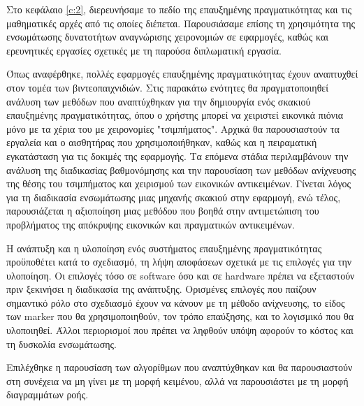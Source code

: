 

 \label{c:design}



Στο κεφάλαιο \ref{c:2}, διερευνήσαμε το πεδίο της επαυξημένης πραγματικότητας και τις μαθηματικές αρχές από τις οποίες διέπεται. Παρουσιάσαμε επίσης τη χρησιμότητα της ενσωμάτωσης δυνατοτήτων αναγνώρισης χειρονομιών σε εφαρμογές, καθώς και ερευνητικές εργασίες σχετικές με τη παρούσα διπλωματική εργασία.


Όπως αναφέρθηκε, πολλές εφαρμογές επαυξημένης πραγματικότητας έχουν αναπτυχθεί στον τομέα των βιντεοπαιχνιδιών. Στις παρακάτω ενότητες θα πραγματοποιηθεί ανάλυση των μεθόδων που αναπτύχθηκαν για την δημιουργία ενός σκακιού επαυξημένης πραγματικότητας, όπου ο χρήστης μπορεί να χειριστεί εικονικά πιόνια μόνο με τα χέρια του με χειρονομίες "τσιμπήματος". Αρχικά θα παρουσιαστούν τα εργαλεία και ο αισθητήρας που χρησιμοποιήθηκαν, καθώς και η πειραματική εγκατάσταση για τις δοκιμές της εφαρμογής. Τα επόμενα στάδια περιλαμβάνουν την ανάλυση της διαδικασίας βαθμονόμησης και την παρουσίαση των μεθόδων ανίχνευσης της θέσης του τσιμπήματος και χειρισμού των εικονικών αντικειμένων. Γίνεται λόγος για τη διαδικασία ενσωμάτωσης μιας μηχανής σκακιού στην εφαρμογή, ενώ τέλος, παρουσιάζεται η αξιοποίηση μιας μεθόδου που βοηθά στην αντιμετώπιση του προβλήματος της απόκρυψης εικονικών και πραγματικών αντικειμένων.





Η ανάπτυξη και η υλοποίηση ενός συστήματος επαυξημένης πραγματικότητας προϋποθέτει κατά το σχεδιασμό, τη λήψη αποφάσεων σχετικά με τις επιλογές για την υλοποίηση. Οι επιλογές τόσο σε software όσο και σε hardware πρέπει να εξεταστούν πριν ξεκινήσει η διαδικασία της ανάπτυξης. Ορισμένες επιλογές που παίζουν σημαντικό ρόλο στο σχεδιασμό έχουν να κάνουν με τη μέθοδο ανίχνευσης, το είδος των marker που θα χρησιμοποιηθούν, τον τρόπο επαύξησης, και το λογισμικό που θα υλοποιηθεί. Άλλοι περιορισμοί που πρέπει να ληφθούν υπόψη αφορούν το κόστος και τη δυσκολία ενσωμάτωσης.


Επιλέχθηκε η παρουσίαση των αλγορίθμων που αναπτύχθηκαν και θα παρουσιαστούν στη συνέχεια να μη γίνει με τη μορφή κειμένου, αλλά να παρουσιάστει με τη μορφή διαγραμμάτων ροής.




